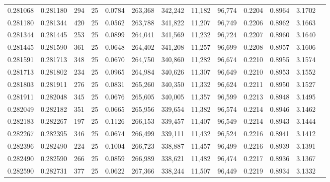 \begin{tabular}{rrrrrrrrrrrrr}
0.281068 & 0.281180 &   294 &  25 &                                     0.0784 & 263,368 & 342,242 &  11,182 &  96,774 & 0.2204 & 0.8964 & 3.1702 \\
0.281180 & 0.281344 &   420 &  25 &                                     0.0562 & 263,788 & 341,822 &  11,207 &  96,749 & 0.2206 & 0.8962 & 3.1663 \\
0.281344 & 0.281445 &   253 &  25 &                                     0.0899 & 264,041 & 341,569 &  11,232 &  96,724 & 0.2207 & 0.8960 & 3.1640 \\
0.281445 & 0.281590 &   361 &  25 &                                     0.0648 & 264,402 & 341,208 &  11,257 &  96,699 & 0.2208 & 0.8957 & 3.1606 \\
0.281591 & 0.281713 &   348 &  25 &                                     0.0670 & 264,750 & 340,860 &  11,282 &  96,674 & 0.2210 & 0.8955 & 3.1574 \\
0.281713 & 0.281802 &   234 &  25 &                                     0.0965 & 264,984 & 340,626 &  11,307 &  96,649 & 0.2210 & 0.8953 & 3.1552 \\
0.281803 & 0.281911 &   276 &  25 &                                     0.0831 & 265,260 & 340,350 &  11,332 &  96,624 & 0.2211 & 0.8950 & 3.1527 \\
0.281911 & 0.282048 &   345 &  25 &                                     0.0676 & 265,605 & 340,005 &  11,357 &  96,599 & 0.2213 & 0.8948 & 3.1495 \\
0.282049 & 0.282182 &   351 &  25 &                                     0.0665 & 265,956 & 339,654 &  11,382 &  96,574 & 0.2214 & 0.8946 & 3.1462 \\
0.282183 & 0.282267 &   197 &  25 &                                     0.1126 & 266,153 & 339,457 &  11,407 &  96,549 & 0.2214 & 0.8943 & 3.1444 \\
0.282267 & 0.282395 &   346 &  25 &                                     0.0674 & 266,499 & 339,111 &  11,432 &  96,524 & 0.2216 & 0.8941 & 3.1412 \\
0.282396 & 0.282490 &   224 &  25 &                                     0.1004 & 266,723 & 338,887 &  11,457 &  96,499 & 0.2216 & 0.8939 & 3.1391 \\
0.282490 & 0.282590 &   266 &  25 &                                     0.0859 & 266,989 & 338,621 &  11,482 &  96,474 & 0.2217 & 0.8936 & 3.1367 \\
0.282590 & 0.282731 &   377 &  25 &                                     0.0622 & 267,366 & 338,244 &  11,507 &  96,449 & 0.2219 & 0.8934 & 3.1332 \\

\end{tabular}
